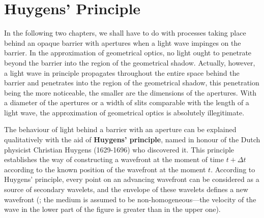 \section{Huygens' Principle}\label{sec:16_9}

In the following two chapters, we shall have to do with processes taking place behind an opaque barrier with apertures when a light wave impinges on the barrier.
In the approximation of geometrical optics, no light ought to penetrate beyond the barrier into the region of the geometrical shadow.
Actually, however, a light wave in principle propagates throughout the entire space behind the barrier and penetrates into the region of the geometrical shadow, this penetration being the more noticeable, the smaller are the dimensions of the apertures.
With a diameter of the apertures or a width of slits comparable with the length of a light wave, the approximation of geometrical optics is absolutely illegitimate.

The behaviour of light behind a barrier with an aperture can be explained qualitatively with the aid of \textbf{Huygens' principle}, named in honour of the Dutch physicist Christian Huygens (1629-1696) who discovered it.
This principle establishes the way of constructing a wavefront at the moment of time $t+\Delta{t}$ according to the known position of the wavefront at the moment $t$.
According to Huygens' principle, every point on an advancing wavefront can be considered as a source of secondary wavelets, and the envelope of these wavelets defines a new wavefront (; the medium is assumed to be non-homogeneous---the velocity of the wave in the lower part of the figure is greater than in the upper one).

